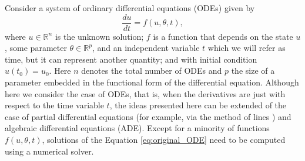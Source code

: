 Consider a system of ordinary differential equations (ODEs) given by
\begin{equation}
 \frac{du}{dt} = f(u, \theta, t),
 \label{eq:original_ODE}
\end{equation}
where $u \in \mathbb{R}^n$ is the unknown solution; $f$ is a function that depends on the state $u$, some parameter $\theta \in \mathbb R^p$, and an independent variable $t$ which we will refer as time, but it can represent another quantity; and with initial condition $u(t_0) = u_0$.
Here $n$ denotes the total number of ODEs and $p$ the size of a parameter embedded in the functional form of the differential equation.
Although here we consider the case of ODEs, that is, when the derivatives are just with respect to the time variable $t$, the ideas presented here can be extended of the case of partial differential equations (for example, via the method of lines \cite{ascher2008numerical}) and algebraic differential equations (ADE).
Except for a minority of functions $f(u,\theta, t)$, solutions of the Equation \eqref{eq:original_ODE} need to be computed using a numerical solver. 


